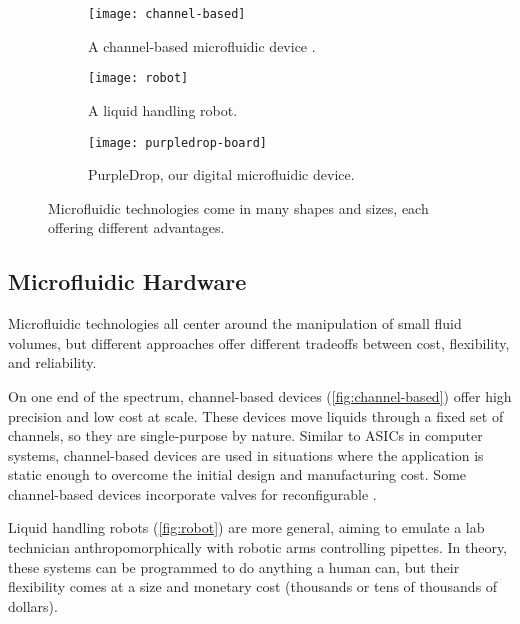 \documentclass{jpaper}
\begin{document}
\begin{figure}
  \centering
  \begin{subfigure}[b]{0.3\linewidth}
    \centering
    \texttt{[image: channel-based]}
    \caption{
      \footnotesize
      A channel-based microfluidic device \cite{channel-img}.
    }
    \label{fig:channel-based}
  \end{subfigure}
  \hfill
  \begin{subfigure}[b]{0.3\linewidth}
    \centering
    \texttt{[image: robot]}
    \caption{
      \footnotesize
      A liquid handling robot.
      \cite{robot-img}
    }
    \label{fig:robot}
  \end{subfigure}
  \hfill
  \begin{subfigure}[b]{0.3\linewidth}
    \centering
    \texttt{[image: purpledrop-board]}
    \caption{
      \footnotesize
      PurpleDrop, our digital microfluidic device.
    }
    \label{fig:purpledrop-dmf}
  \end{subfigure}

  \caption{
    Microfluidic technologies come in many shapes and sizes, each offering different advantages.
  }
  \label{fig:microfluidic-types}
\end{figure}

\subsection{Microfluidic Hardware}

Microfluidic technologies all center around the manipulation of small fluid volumes, but different approaches offer different tradeoffs between cost, flexibility, and reliability.

On one end of the spectrum, channel-based devices (\autoref{fig:channel-based}) offer high precision and low cost at scale.
These devices move liquids through a fixed set of channels, so they are single-purpose by nature.
Similar to ASICs in computer systems, channel-based devices are used in situations where the application is static enough to overcome the initial design and manufacturing cost.
Some channel-based devices incorporate valves for reconfigurable \cite{amin2007aquacore}.

Liquid handling robots (\autoref{fig:robot}) are more general, aiming to emulate a lab technician anthropomorphically with robotic arms controlling pipettes.
In theory, these systems can be programmed to do anything a human can, but their flexibility comes at a size and monetary cost (thousands or tens of thousands of dollars).
\end{document}
